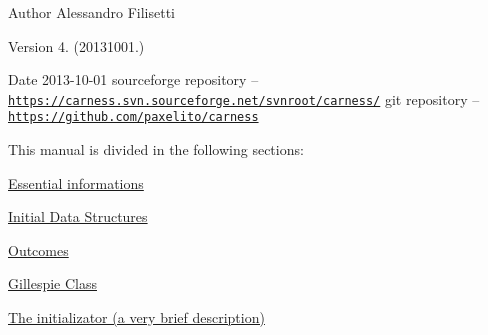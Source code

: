 \begin{DoxyAuthor}{Author}
Alessandro Filisetti 
\end{DoxyAuthor}
\begin{DoxyVersion}{Version}
4. (20131001.) 
\end{DoxyVersion}
\begin{DoxyDate}{Date}
2013-\/10-\/01 sourceforge repository -- \href{https://carness.svn.sourceforge.net/svnroot/carness/}{\tt https\-://carness.\-svn.\-sourceforge.\-net/svnroot/carness/} git repository -- \href{https://github.com/paxelito/carness}{\tt https\-://github.\-com/paxelito/carness}
\end{DoxyDate}
This manual is divided in the following sections\-:
\begin{DoxyItemize}
\item \hyperlink{intro}{Essential informations}
\item \hyperlink{pageInitStr}{Initial Data Structures}
\item \hyperlink{pageoutcomes}{Outcomes}
\item \hyperlink{pageGillespie}{Gillespie Class}
\item \hyperlink{pageInitializator}{The initializator (a very brief description)} 
\end{DoxyItemize}